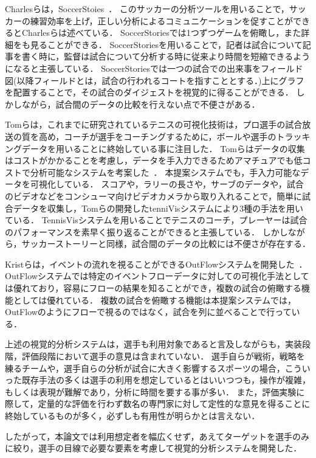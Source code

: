 \documentclass[sotsuron]{kuee}
\begin{document}
	Charlesらは，SoccerStoies~\cite{SoccerStory}．
	このサッカーの分析ツールを用いることで，サッカーの練習効率を上げ，正しい分析によるコミュニケーションを促すことができるとCharlesらは述べている．
	SoccerStoriesでは1つずつゲームを俯瞰し，また詳細をも見ることができる．
	SoccerStoriesを用いることで，記者は試合について記事を書く時に，監督は試合について分析する時に従来より時間を短縮できるようになると主張している．
	SoccerStoriesでは一つの試合での出来事をフィールド図(以降フィールドとは，試合の行われるコートを指すこととする．)上にグラフを配置することで，その試合のダイジェストを視覚的に得ることができる．
	しかしながら，試合間のデータの比較を行えない点で不便さがある．
	
	Tomらは，これまでに研究されているテニスの可視化技術は，プロ選手の試合放送の質を高め，コーチが選手をコーチングするために，ボールや選手のトラッキングデータを用いることに終始している事に注目した．
	Tomらはデータの収集はコストがかかることを考慮し，データを手入力できるためアマチュアでも低コストで分析可能なシステムを考案した~\cite{TenniVis}．
	本提案システムでも，手入力可能なデータを可視化している．
	スコアや，ラリーの長さや，サーブのデータや，試合のビデオなどをコンシューマ向けビデオカメラから取り入れることで，簡単に試合データを収集し，Tomらの開発したtenniVisシステムにより3種の手法を用いている．
	TennisVisシステムを用いることでテニスのコーチ，プレーヤーは試合のパフォーマンスを素早く振り返ることができると主張している．
	しかしながら，サッカーストーリーと同様，試合間のデータの比較には不便さが存在する．
	
	Kristらは，イベントの流れを視ることができるOutFlowシステムを開発した~\cite{Outflow}．
	OutFlowシステムでは特定のイベントフローデータに対しての可視化手法としては優れており，容易にフローの結果を知ることができ，複数の試合の俯瞰する機能としては優れている．
	複数の試合を俯瞰する機能は本提案システムでは，OutFlowのようにフローで視るのではなく，試合を列に並べることで行っている．

	上述の視覚的分析システムは，選手も利用対象であると言及しながらも，実装段階，評価段階において選手の意見は含まれていない．
	選手自らが戦術，戦略を練るチームや，選手自らの分析が試合に大きく影響するスポーツの場合，こういった既存手法の多くは選手の利用を想定しているとはいいつつも，操作が複雑，もしくは表現が難解であり，分析に時間を要する事が多い．
	また，評価実験に際して，定量的な評価を行わず数名の専門家に対して定性的な意見を得ることに終始しているものが多く，必ずしも有用性が明らかとは言えない．
	
	したがって，本論文では利用想定者を幅広くせず，あえてターゲットを選手のみに絞り，選手の目線で必要な要素を考慮して視覚的分析システムを開発した．
	
\end{document}
